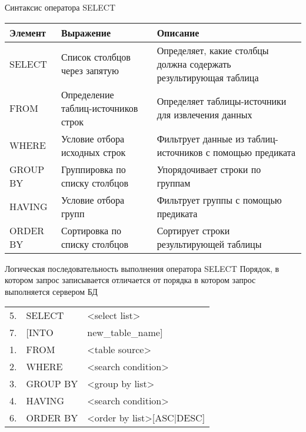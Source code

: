 \documentclass[12pt]{article}
\begin{document}
\begin{nota}{Синтаксис оператора SELECT}
    \begin{center}
        \begin{tabular}{|m{5em}|m{10em}|m{23em}|}
            \hline
            Элемент & Выражение & Описание \\
            \hline
            SELECT & Список столбцов через запятую & Определяет, какие столбцы должна содержать результирующая таблица \\
            \hline
            FROM & Определение таблиц-источников строк & Определяет таблицы-источники для извлечения данных \\
            \hline
            WHERE & Условие отбора исходных строк & Фильтрует данные из таблиц-источников с помощью предиката \\
            \hline
            GROUP BY & Группировка по списку столбцов & Упорядочивает строки по группам \\
            \hline 
            HAVING & Условие отбора групп & Фильтрует группы с помощью предиката \\ 
            \hline
            ORDER BY & Сортировка по списку столбцов & Сортирует строки результирующей таблицы \\
            \hline
        \end{tabular}
    \end{center}
\end{nota}

\begin{Remark}{Логическая последовательность выполнения оператора SELECT}
    Порядок, в котором запрос записывается отличается от порядка в котором запрос выполняется сервером БД 

    \begin{tabular}{m{2em} m{6em} m{15em}}
        5. & SELECT & <select list> \\
        7. & [INTO & new\_table\_name] \\
        1. & FROM & <table source> \\
        2. & WHERE & <search condition> \\
        3. & GROUP BY & <group by list> \\
        4. & HAVING & <search condition> \\
        6. & ORDER BY & <order by list>[ASC|DESC] \\
    \end{tabular}
\end{Remark}
\end{document}
